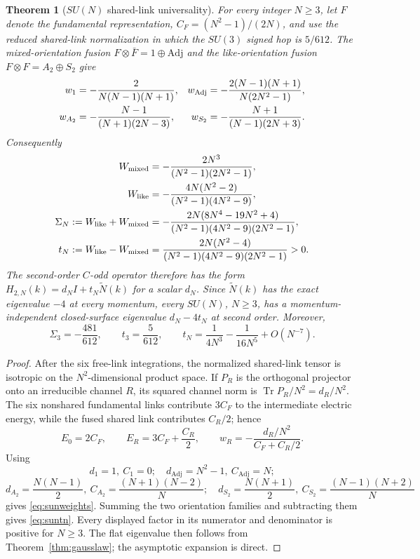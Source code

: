\documentclass[11pt]{article}
\newtheorem{theorem}{Theorem}[section]
\newcommand{\Tr}{\operatorname{Tr}}
\newcommand{\Nt}{\widetilde N}
\begin{document}
\begin{theorem}[$SU(N)$ shared-link universality]\label{thm:suniversal}
For every integer $N\geq3$, let $F$ denote the fundamental representation,
$C_F=(N^2-1)/(2N)$, and use the reduced shared-link normalization in which
the $SU(3)$ signed hop is $5/612$. The mixed-orientation fusion
$F\otimes\bar F=1\oplus\mathrm{Adj}$ and the like-orientation fusion
$F\otimes F=A_2\oplus S_2$ give
\begin{align}
w_1&=-\frac{2}{N(N-1)(N+1)},&
w_{\mathrm{Adj}}&=-\frac{2(N-1)(N+1)}{N(2N^2-1)},\notag\\
w_{A_2}&=-\frac{N-1}{(N+1)(2N-3)},&
w_{S_2}&=-\frac{N+1}{(N-1)(2N+3)}.
\label{eq:sunweights}
\end{align}
Consequently
\begin{align}
W_{\mathrm{mixed}}&=-\frac{2N^3}{(N^2-1)(2N^2-1)},\notag\\
W_{\mathrm{like}}&=-\frac{4N(N^2-2)}{(N^2-1)(4N^2-9)},\notag\\
\Sigma_N:=W_{\mathrm{like}}+W_{\mathrm{mixed}}
&=-\frac{2N(8N^4-19N^2+4)}{(N^2-1)(4N^2-9)(2N^2-1)},\notag\\
t_N:=W_{\mathrm{like}}-W_{\mathrm{mixed}}
&=\frac{2N(N^2-4)}{(N^2-1)(4N^2-9)(2N^2-1)}>0.
\label{eq:suntn}
\end{align}
The second-order $C$-odd operator therefore has the form
$H_{2,N}(k)=d_NI+t_N\Nt(k)$ for a scalar $d_N$. Since
$\Nt(k)$ has the exact eigenvalue $-4$ at every momentum, every $SU(N)$,
$N\geq3$, has a momentum-independent closed-surface eigenvalue
$d_N-4t_N$ at second order. Moreover,
\[
\Sigma_3=-\frac{481}{612},\qquad t_3=\frac5{612},\qquad
t_N=\frac{1}{4N^3}-\frac{1}{16N^5}+O(N^{-7}).
\]
\end{theorem}

\begin{proof}
After the six free-link integrations, the normalized shared-link tensor is
isotropic on the $N^2$-dimensional product space. If $P_R$ is the orthogonal
projector onto an irreducible channel $R$, its squared channel norm is
$\Tr P_R/N^2=d_R/N^2$. The six nonshared fundamental links contribute
$3C_F$ to the intermediate electric energy, while the fused shared link
contributes $C_R/2$; hence
\[
E_0=2C_F,\qquad E_R=3C_F+\frac{C_R}{2},\qquad
w_R=-\frac{d_R/N^2}{C_F+C_R/2}.
\]
Using
\[
d_1=1,\ C_1=0;\quad d_{\mathrm{Adj}}=N^2-1,\ C_{\mathrm{Adj}}=N;
\]
\[
d_{A_2}=\frac{N(N-1)}2,\ C_{A_2}=\frac{(N+1)(N-2)}N;\quad
 d_{S_2}=\frac{N(N+1)}2,\ C_{S_2}=\frac{(N-1)(N+2)}N
\]
gives \eqref{eq:sunweights}. Summing the two orientation families and
subtracting them gives \eqref{eq:suntn}. Every displayed factor in its
numerator and denominator is positive for $N\geq3$. The flat eigenvalue then
follows from Theorem~\ref{thm:gausslaw}; the asymptotic expansion is direct.
\end{proof}
\end{document}
